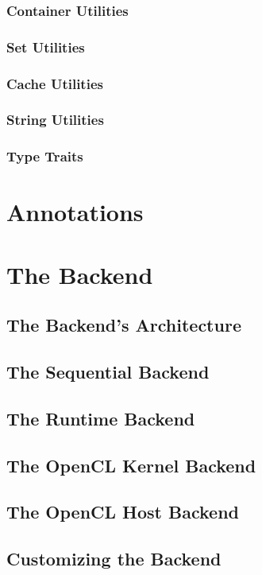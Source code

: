 \subsubsection{Container Utilities}
\subsubsection{Set Utilities}
\subsubsection{Cache Utilities}
\subsubsection{String Utilities}
\subsubsection{Type Traits}



\section{Annotations}
\label{sec:Compiler.Core.Annotations}



\section{The Backend} \label{sec:Compiler.Backend}
\subsection{The Backend's Architecture}
\subsection{The Sequential Backend}
\subsection{The Runtime Backend}
\subsection{The OpenCL Kernel Backend}
\subsection{The OpenCL Host Backend}
\subsection{Customizing the Backend}

